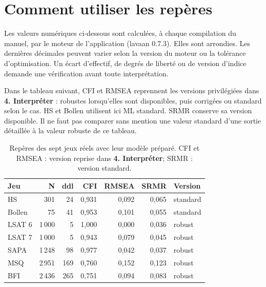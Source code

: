 \documentclass[
  french,
  11pt,
  a4paper,
  DIV=11,
  numbers=noendperiod]{scrreprt}
\begin{document}
\section{Comment utiliser les
repères}\label{comment-utiliser-les-repuxe8res}

Les valeurs numériques ci-dessous sont calculées, à chaque compilation
du manuel, par le moteur de l'application (lavaan 0.7.3). Elles sont
arrondies. Les dernières décimales peuvent varier selon la version du
moteur ou la tolérance d'optimisation. Un écart d'effectif, de degrés de
liberté ou de version d'indice demande une vérification avant toute
interprétation.

Dans le tableau suivant, CFI et RMSEA reprennent les versions
privilégiées dans \textbf{4. Interpréter} : robustes lorsqu'elles sont
disponibles, puis corrigées ou standard selon le cas. HS et Bollen
utilisent ici ML standard. SRMR conserve sa version disponible. Il ne
faut pas comparer sans mention une valeur standard d'une sortie
détaillée à la valeur robuste de ce tableau.


{

\begin{longtable}[]{@{}lrrrrrl@{}}

\caption{\label{tbl-reperes}Repères des sept jeux réels avec leur modèle
préparé. CFI et RMSEA : version reprise dans \textbf{4. Interpréter};
SRMR : version standard.}

\tabularnewline

\toprule\noalign{}
Jeu & N & ddl & CFI & RMSEA & SRMR & Version \\
\midrule\noalign{}
\endhead
\bottomrule\noalign{}
\endlastfoot
HS & 301 & 24 & 0,931 & 0,092 & 0,065 & standard \\
Bollen & 75 & 41 & 0,953 & 0,101 & 0,055 & standard \\
LSAT 6 & 1\,000 & 5 & 1,000 & 0,000 & 0,036 & robust \\
LSAT 7 & 1\,000 & 5 & 0,943 & 0,079 & 0,045 & robust \\
SAPA & 1\,248 & 98 & 0,977 & 0,042 & 0,037 & robust \\
MSQ & 2\,951 & 169 & 0,760 & 0,152 & 0,123 & robust \\
BFI & 2\,436 & 265 & 0,751 & 0,094 & 0,083 & robust \\

\end{longtable}

}
\end{document}
